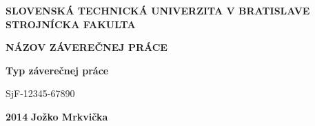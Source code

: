 \renewcommand\thepage{\roman{page}}
\thispagestyle{empty}

\noindent \begin{center}
\textbf{{\large{}SLOVENSKÁ TECHNICKÁ UNIVERZITA V BRATISLAVE}}\\
\textbf{{\large{}STROJNÍCKA FAKULTA}}\textbf{\large{} }\\
\vspace{3cm}
\par\end{center}

\noindent \begin{center}
\vspace{3cm}
\par\end{center}



\begin{center}
\textbf{\textsc{\Large{}NÁZOV ZÁVEREČNEJ PRÁCE}}\\
\par\end{center}{\Large \par}

\begin{center}
\textbf{\large{}Typ záverečnej práce}\\
\par\end{center}{\large \par}

\begin{center}
{\large{}SjF-12345-67890}\\
\par\end{center}{\large \par}



\vfill
\noindent \textbf{\large{}2014} \hfill \textbf{\large{}Jožko Mrkvička}
\cleardoublepage 
